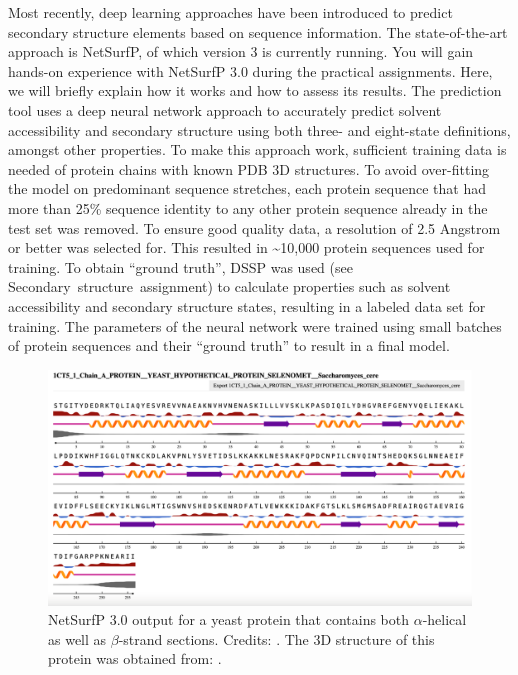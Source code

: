 Most recently, deep learning approaches have been introduced to predict secondary structure elements based on sequence information.
The state-of-the-art approach is NetSurfP, of which version 3 is currently running.
You will gain hands-on experience with NetSurfP 3.0 during the practical assignments.
Here, we will briefly explain how it works and how to assess its results.
The prediction tool uses a deep neural network approach to accurately predict solvent accessibility and secondary structure using both three- and eight-state definitions, amongst other properties.
To make this approach work, sufficient training data is needed of protein chains with known PDB 3D structures.
To avoid over-fitting the model on predominant sequence stretches, each protein sequence that had more than 25\% sequence identity to any other protein sequence already in the test set was removed.
To ensure good quality data, a resolution of 2.5 Angstrom or better was selected for.
This resulted in {\textasciitilde}10,000 protein sequences used for training.
To obtain ``ground truth'', DSSP was used (see Secondary~structure~assignment) to calculate properties such as solvent accessibility and secondary structure states, resulting in a labeled data set for training.
The parameters of the neural network were trained using small batches of protein sequences and their ``ground truth'' to result in a final model.

\begin{figure}[!htbp]
\centering
\includegraphics[width=0.7\linewidth]{files/netsurfp-c17f75b7b4e10fe6687404116337c985.png}
\caption[]{NetSurfP 3.0 output for a yeast protein that contains both $\alpha$-helical as well as $\beta$-strand sections.
Credits: \cite{netsurfp_2022}. The 3D structure of this protein was obtained from: \cite{1CT5_1999}.}
\label{netsurfp}
\end{figure}

